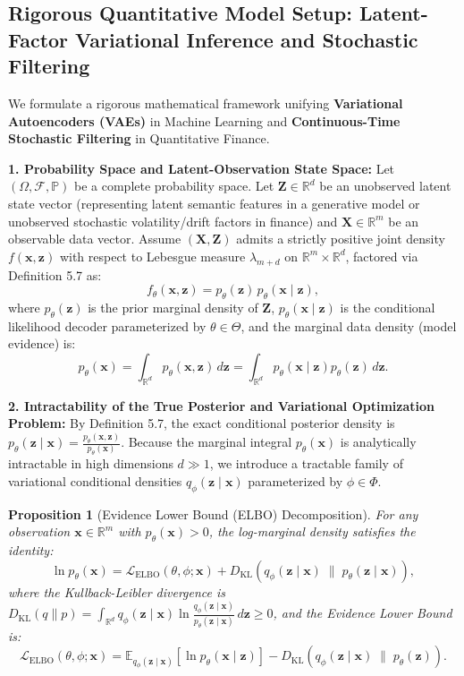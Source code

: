 \documentclass[11pt, letterpaper]{article}
\newtheorem{proposition}[theorem]{Proposition}
\theoremstyle{definition}
\theoremstyle{remark}
\newcommand{\E}{\mathbb{E}}
\newcommand{\Prob}{\mathbb{P}}
\newcommand{\F}{\mathcal{F}}
\begin{document}
\subsection{Rigorous Quantitative Model Setup: Latent-Factor Variational Inference and Stochastic Filtering}

We formulate a rigorous mathematical framework unifying \textbf{Variational Autoencoders (VAEs)} in Machine Learning and \textbf{Continuous-Time Stochastic Filtering} in Quantitative Finance.

\textbf{1. Probability Space and Latent-Observation State Space:}
Let $(\Omega, \F, \Prob)$ be a complete probability space. Let $\mathbf{Z} \in \mathbb{R}^d$ be an unobserved latent state vector (representing latent semantic features in a generative model or unobserved stochastic volatility/drift factors in finance) and $\mathbf{X} \in \mathbb{R}^m$ be an observable data vector. Assume $(\mathbf{X}, \mathbf{Z})$ admits a strictly positive joint density $f(\mathbf{x}, \mathbf{z})$ with respect to Lebesgue measure $\lambda_{m+d}$ on $\mathbb{R}^m \times \mathbb{R}^d$, factored via Definition 5.7 as:
\[ f_\theta(\mathbf{x}, \mathbf{z}) = p_\theta(\mathbf{z}) \, p_\theta(\mathbf{x} \mid \mathbf{z}), \]
where $p_\theta(\mathbf{z})$ is the prior marginal density of $\mathbf{Z}$, $p_\theta(\mathbf{x} \mid \mathbf{z})$ is the conditional likelihood decoder parameterized by $\theta \in \Theta$, and the marginal data density (model evidence) is:
\[ p_\theta(\mathbf{x}) = \int_{\mathbb{R}^d} p_\theta(\mathbf{x}, \mathbf{z}) \, d\mathbf{z} = \int_{\mathbb{R}^d} p_\theta(\mathbf{x} \mid \mathbf{z}) p_\theta(\mathbf{z}) \, d\mathbf{z}. \]

\textbf{2. Intractability of the True Posterior and Variational Optimization Problem:}
By Definition 5.7, the exact conditional posterior density is $p_\theta(\mathbf{z} \mid \mathbf{x}) = \frac{p_\theta(\mathbf{x}, \mathbf{z})}{p_\theta(\mathbf{x})}$. Because the marginal integral $p_\theta(\mathbf{x})$ is analytically intractable in high dimensions $d \gg 1$, we introduce a tractable family of variational conditional densities $q_\phi(\mathbf{z} \mid \mathbf{x})$ parameterized by $\phi \in \Phi$.

\begin{proposition}[Evidence Lower Bound (ELBO) Decomposition]
For any observation $\mathbf{x} \in \mathbb{R}^m$ with $p_\theta(\mathbf{x}) > 0$, the log-marginal density satisfies the identity:
\[ \ln p_\theta(\mathbf{x}) = \mathcal{L}_{\text{ELBO}}(\theta, \phi; \mathbf{x}) + D_{\text{KL}}\left( q_\phi(\mathbf{z} \mid \mathbf{x}) \;\|\; p_\theta(\mathbf{z} \mid \mathbf{x}) \right), \]
where the Kullback-Leibler divergence is $D_{\text{KL}}(q \| p) = \int_{\mathbb{R}^d} q_\phi(\mathbf{z} \mid \mathbf{x}) \ln \frac{q_\phi(\mathbf{z} \mid \mathbf{x})}{p_\theta(\mathbf{z} \mid \mathbf{x})} \, d\mathbf{z} \ge 0$, and the Evidence Lower Bound is:
\[ \mathcal{L}_{\text{ELBO}}(\theta, \phi; \mathbf{x}) = \E_{q_\phi(\mathbf{z} \mid \mathbf{x})}\left[ \ln p_\theta(\mathbf{x} \mid \mathbf{z}) \right] - D_{\text{KL}}\left( q_\phi(\mathbf{z} \mid \mathbf{x}) \;\|\; p_\theta(\mathbf{z}) \right). \]
\end{proposition}
\end{document}
